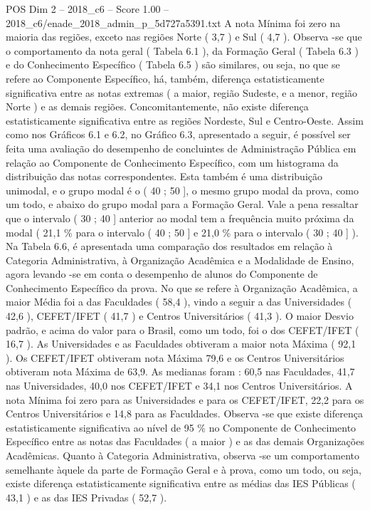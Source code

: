 \begin{textsample}{POS Dim 2 – 2018\_c6 – Score 1.00 – 2018\_c6/enade\_2018\_admin\_p\_5d727a5391.txt}
A nota Mínima foi zero na maioria das regiões, exceto nas regiões Norte ( 3,7 ) e Sul ( 4,7 ).
Observa -se que o comportamento da nota geral ( Tabela 6.1 ), da Formação Geral ( Tabela 6.3 ) e do Conhecimento Específico ( Tabela 6.5 ) são similares, ou seja, no que se refere ao Componente Específico, há, também, diferença estatisticamente significativa entre as notas extremas ( a maior, região Sudeste, e a menor, região Norte ) e as demais regiões.
Concomitantemente, não existe diferença estatisticamente significativa entre as regiões Nordeste, Sul e Centro-Oeste.
Assim como nos Gráficos 6.1 e 6.2, no Gráfico 6.3, apresentado a seguir, é possível ser feita uma avaliação do desempenho de concluintes de Administração Pública em relação ao Componente de Conhecimento Específico, com um histograma da distribuição das notas correspondentes.
Esta também é uma distribuição unimodal, e o grupo modal é o ( 40 ; 50 ], o mesmo grupo modal da prova, como um todo, e abaixo do grupo modal para a Formação Geral.
Vale a pena ressaltar que o intervalo ( 30 ; 40 ] anterior ao modal tem a frequência muito próxima da modal ( 21,1 \% para o intervalo ( 40 ; 50 ] e 21,0 \% para o intervalo ( 30 ; 40 ] ).
Na Tabela 6.6, é apresentada uma comparação dos resultados em relação à Categoria Administrativa, à Organização Acadêmica e a Modalidade de Ensino, agora levando -se em conta o desempenho de alunos do Componente de Conhecimento Específico da prova.
No que se refere à Organização Acadêmica, a maior Média foi a das Faculdades ( 58,4 ), vindo a seguir a das Universidades ( 42,6 ), CEFET/IFET ( 41,7 ) e Centros Universitários ( 41,3 ).
O maior Desvio padrão, e acima do valor para o Brasil, como um todo, foi o dos CEFET/IFET ( 16,7 ).
As Universidades e as Faculdades obtiveram a maior nota Máxima ( 92,1 ).
Os CEFET/IFET obtiveram nota Máxima 79,6 e os Centros Universitários obtiveram nota Máxima de 63,9.
As medianas foram : 60,5 nas Faculdades, 41,7 nas Universidades, 40,0 nos CEFET/IFET e 34,1 nos Centros Universitários.
A nota Mínima foi zero para as Universidades e para os CEFET/IFET, 22,2 para os Centros Universitários e 14,8 para as Faculdades.
Observa -se que existe diferença estatisticamente significativa ao nível de 95 \% no Componente de Conhecimento Específico entre as notas das Faculdades ( a maior ) e as das demais Organizações Acadêmicas.
Quanto à Categoria Administrativa, observa -se um comportamento semelhante àquele da parte de Formação Geral e à prova, como um todo, ou seja, existe diferença estatisticamente significativa entre as médias das IES Públicas ( 43,1 ) e as das IES Privadas ( 52,7 ).

\end{textsample}
